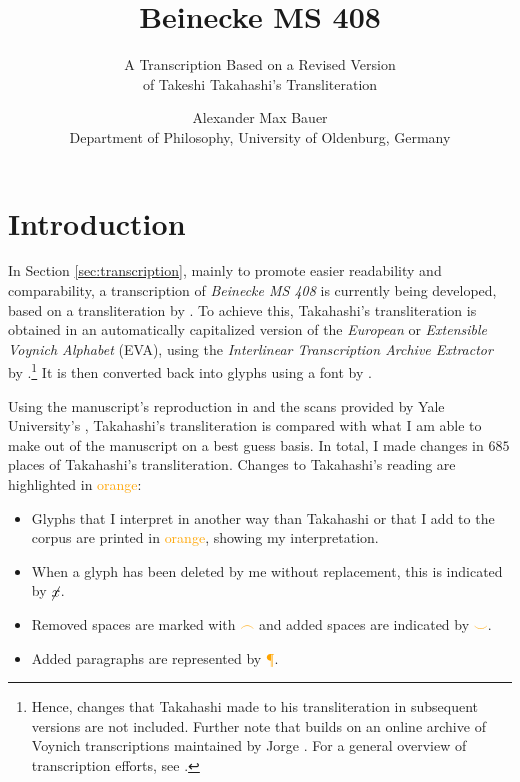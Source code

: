 \documentclass{scrarticle}
\title{Beinecke MS 408}
\subtitle{A Transcription Based on a Revised Version\\of Takeshi Takahashi's Transliteration}
\author{Alexander Max Bauer\\\small{Department of Philosophy, University of Oldenburg, Germany}}
\date{}
\begin{document}
\maketitle
\vfill
\noindent{}
\vfill


\clearpage
\tableofcontents


\clearpage
\section{Introduction}\label{sec:introduction}
In Section \ref{sec:transcription}, mainly to promote easier readability and comparability, a transcription of \textit{Beinecke MS 408} is currently being developed, based on a transliteration by \citet{takahashi_voynich_2004}.
To achieve this, Takahashi's transliteration is obtained in an automatically capitalized version of the \textit{European} or \textit{Extensible Voynich Alphabet} (EVA), using the \textit{Interlinear Transcription Archive Extractor} by \citet{schwerdtfeger_voynich_2004}.\footnote{Hence, changes that Takahashi made to his transliteration in subsequent versions are not included. Further note that \citet{schwerdtfeger_voynich_2004} builds on an online archive of Voynich transcriptions maintained by Jorge \citet{stolfi_voynich_1998}. For a general overview of transcription efforts, see \citet{zandbergen_text_2023}.}
It is then converted back into glyphs using a font by \citet{bettencourt_voynich_2019}.

Using the manuscript's reproduction in \citet{clemens_voynich_2016} and the scans provided by Yale University's \citet{beinecke_voynich_2004}, Takahashi's transliteration is compared with what I am able to make out of the manuscript on a best guess basis.
In total, I made changes in $685$ places of Takahashi's transliteration.
Changes to Takahashi's reading are highlighted in \textcolor{orange}{orange}:

\begin{itemize}
   \item Glyphs that I interpret in another way than Takahashi or that I add to the corpus are printed in \textcolor{orange}{orange}, showing my interpretation.
   \item When a glyph has been deleted by me without replacement, this is indicated by \textcolor{orange}{$\cancel{x}$}.
   \item Removed spaces are marked with \textcolor{orange}{$\frown$} and added spaces are indicated by \textcolor{orange}{$\smile$}.
   \item Added paragraphs are represented by \textcolor{orange}{{\P}}.
\end{itemize}
\end{document}
